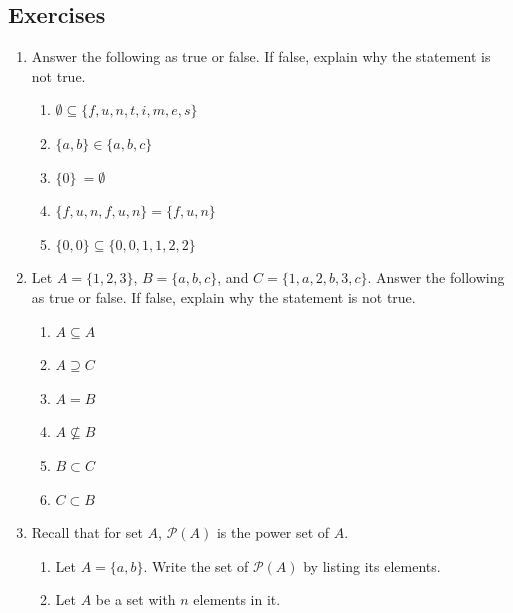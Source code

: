 \documentclass[
]{book}
\theoremstyle{definition}
\theoremstyle{definition}
\theoremstyle{definition}
\theoremstyle{definition}
\theoremstyle{remark}
\begin{document}
\hypertarget{exercises-3}{%
\subsection{Exercises}\label{exercises-3}}

\begin{enumerate}
\def\labelenumi{\arabic{enumi}.}
\item
  Answer the following as true or false. If false, explain why the statement is not true.

  \begin{enumerate}
  \def\labelenumii{\alph{enumii}.}
  \item
    \(\emptyset \subseteq \{f,u,n,t,i,m,e,s\}\)
  \item
    \(\{a,b\} \in \{a,b,c\}\)
  \item
    \(\{0 \}\ = \emptyset\)
  \item
    \(\{f,u,n,f,u,n \}=\{f,u,n \}\)
  \item
    \(\{0,0\} \subseteq \{0,0,1,1,2,2\}\)
  \end{enumerate}
\item
  Let \(A=\{1, 2, 3\}\), \(B=\{a, b, c\}\), and \(C=\{1, a, 2, b, 3, c\}\). Answer the following as true or false. If false, explain why the statement is not true.

  \begin{enumerate}
  \def\labelenumii{\alph{enumii}.}
  \item
    \(A \subseteq A\)
  \item
    \(A\supseteq C\)
  \item
    \(A=B\)
  \item
    \(A \nsubseteq B\)
  \item
    \(B \subset C\)
  \item
    \(C \subset B\)
  \end{enumerate}
\item
  Recall that for set \(A\), \(\mathcal{P}(A)\) is the power set of \(A\).

  \begin{enumerate}
  \def\labelenumii{\alph{enumii}.}
  \item
    Let \(A=\{a,b\}\). Write the set of \(\mathcal{P}(A)\) by listing its elements.
  \item
    Let \(A\) be a set with \(n\) elements in it.


\end{enumerate}
\end{enumerate}
\end{document}
